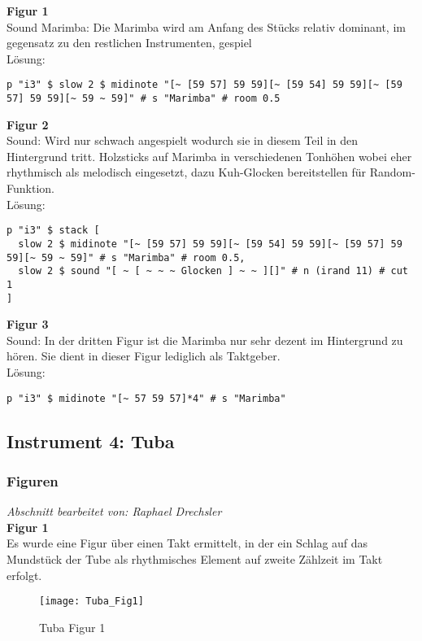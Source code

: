 \documentclass[
10pt, %
a4paper, %
oneside, %
headinclude,footinclude, %
BCOR5mm, %
]{scrartcl}
\begin{document}
\noindent \textbf{Figur 1}\\
Sound Marimba: Die Marimba wird am Anfang des Stücks relativ dominant, im gegensatz zu den restlichen Instrumenten, gespiel\\
Lösung:\\
\begin{lstlisting}
p "i3" $ slow 2 $ midinote "[~ [59 57] 59 59][~ [59 54] 59 59][~ [59 57] 59 59][~ 59 ~ 59]" # s "Marimba" # room 0.5
\end{lstlisting}
\noindent \textbf{Figur 2}\\
Sound: Wird nur schwach angespielt wodurch sie in diesem Teil in den Hintergrund tritt.
Holzsticks auf Marimba in verschiedenen Tonhöhen wobei eher rhythmisch als melodisch eingesetzt, dazu Kuh-Glocken bereitstellen für Random-Funktion.\\
Lösung:\\
\begin{lstlisting}
p "i3" $ stack [
  slow 2 $ midinote "[~ [59 57] 59 59][~ [59 54] 59 59][~ [59 57] 59 59][~ 59 ~ 59]" # s "Marimba" # room 0.5,
  slow 2 $ sound "[ ~ [ ~ ~ ~ Glocken ] ~ ~ ][]" # n (irand 11) # cut 1
]
\end{lstlisting}
\noindent \textbf{Figur 3}\\
Sound: In der dritten Figur ist die Marimba nur sehr dezent im Hintergrund zu hören. Sie dient in dieser Figur lediglich als Taktgeber.\\
Lösung:\\
\begin{lstlisting}
p "i3" $ midinote "[~ 57 59 57]*4" # s "Marimba"
\end{lstlisting}
\subsection{Instrument 4: Tuba}
\subsubsection{Figuren}
\textit{Abschnitt bearbeitet von: Raphael Drechsler}\\

\noindent\textbf{Figur 1}\\
Es wurde eine Figur über einen Takt ermittelt, in der ein Schlag auf das Mundstück der Tube als rhythmisches Element auf zweite Zählzeit im Takt erfolgt.\\
\begin{figure}[h]
	\centering 
	\texttt{[image: Tuba\_Fig1]} 
	\caption{Tuba Figur 1}
\end{figure}
\end{document}
